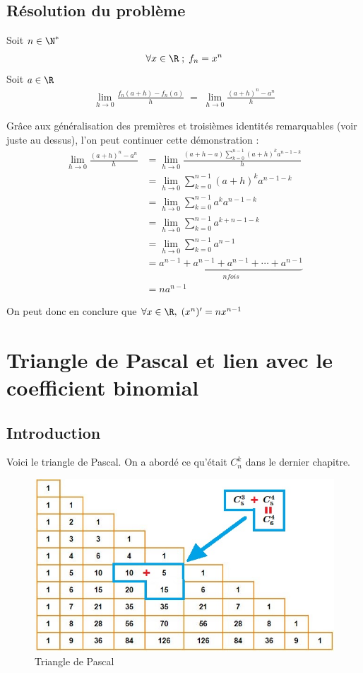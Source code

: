 \documentclass{report}
\begin{document}
\section{Résolution du problème}
Soit $n \in \N^{*}$
\begin{gather}
    \forall x \in \R \; ; \; f_n = x^n
\end{gather}
Soit $a \in \R$
\begin{gather}
    \lim_{h \to 0} \frac {f_n(a+h) - f_n(a)} {h} \; = \; \lim_{h \to 0} \frac {(a+h)^n - a^n} {h}
\end{gather}

Grâce aux généralisation des premières et troisièmes identités remarquables (voir juste au dessus), l’on peut continuer cette démonstration :
\begin{align} 
    \lim_{h \to 0} \frac {(a+h)^n - a^n} {h} 
    &= \lim_{h \to 0} \frac {(a+h-a) \sum_{k=0}^{n-1} (a+h)^k a^{n-1-k} } {h} \\ &= \lim_{h \to 0} \sum_{k=0}^{n-1} (a+h)^k a^{n-1-k} \\ 
    &= \lim_{h \to 0} \sum_{k=0}^{n-1} a^k a^{n-1-k} \\ 
    &= \lim_{h \to 0} \sum_{k=0}^{n-1} a^{k+n-1-k} \\ 
    &= \lim_{h \to 0}  \sum_{k=0}^{n-1} a^{n-1} \\ 
    &= \underbrace{a^{n-1}+a^{n-1}+a^{n-1}+ \cdots + a^{n-1} }_{n fois} \\ 
    &= na^{n-1} 
\end{align}  

On peut donc en conclure que $\forall x \in \R, \; (x^n)' = nx^{n-1}$


\chapter{Triangle de Pascal et lien avec le coefficient binomial}

\section{Introduction}
Voici le triangle de Pascal. On a abordé ce qu'était $C_n^k$ dans le dernier chapitre. 

\begin{figure}[htp]
    \centering
    \includegraphics[width=\textwidth]{pascal.jpg}
    \caption{Triangle de Pascal}
    \label{Triangle de Pascal}
\end{figure}
\end{document}

